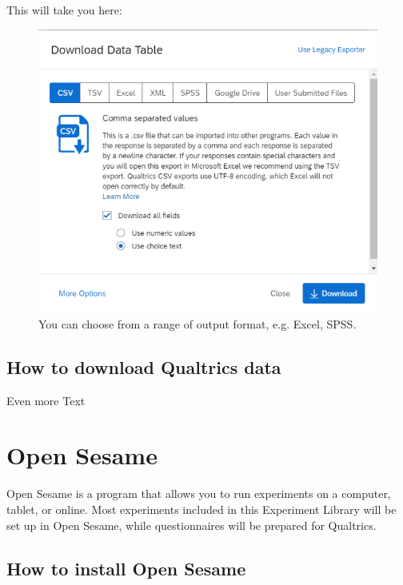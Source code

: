 \documentclass[
]{book}
\begin{document}
This will take you here:

\begin{figure}

{\centering \includegraphics[width=0.85\linewidth]{images/Qualtrics/15exportdata} 

}

\caption{You can choose from a range of output format, e.g. Excel, SPSS.}\label{fig:Figure11-15}
\end{figure}

\hypertarget{how-to-download-qualtrics-data}{%
\section{How to download Qualtrics data}\label{how-to-download-qualtrics-data}}

Even more Text

\hypertarget{open-sesame}{%
\chapter{Open Sesame}\label{open-sesame}}

Open Sesame is a program that allows you to run experiments on a computer, tablet, or online. Most experiments included in this Experiment Library will be set up in Open Sesame, while questionnaires will be prepared for Qualtrics.

\hypertarget{how-to-install-open-sesame}{%
\section{How to install Open Sesame}\label{how-to-install-open-sesame}}
\end{document}
